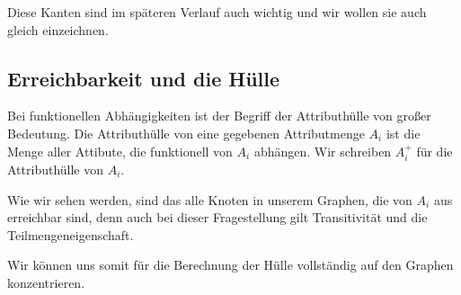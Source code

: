 \documentclass[a4paper, ngerman]{article}
\begin{document}
Diese Kanten sind im späteren Verlauf
auch wichtig und wir wollen sie auch gleich einzeichnen.
\begin{center}
\end{center}

\subsection*{Erreichbarkeit und die Hülle}
Bei funktionellen Abhängigkeiten ist
der Begriff der Attributhülle 
von großer Bedeutung.
Die Attributhülle von eine
gegebenen Attributmenge $A_i$
ist die Menge aller Attibute, 
die funktionell von $A_i$ abhängen.
Wir schreiben $A_i^+$ für die Attributhülle von $A_i$.

Wie wir sehen werden,
sind das alle Knoten in unserem Graphen,
die von $A_i$ aus erreichbar sind,
denn auch bei dieser Fragestellung
gilt Transitivität und die Teilmengeneigenschaft.

Wir können uns somit für die Berechnung der Hülle
vollständig auf den Graphen konzentrieren.
\end{document}
